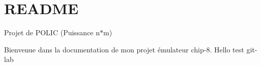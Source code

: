 \chapter{README}
\hypertarget{md_README}{}\label{md_README}
Projet de POLIC (Puissance n\texorpdfstring{$\ast$}{*}m)

Bienvenue dans la documentation de mon projet émulateur chip-\/8. Hello test git-\/lab 